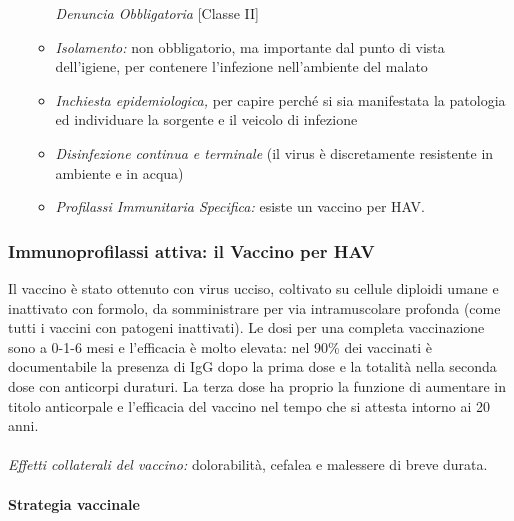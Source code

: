 \begin{enumerate}
\begin{itemize}
  \emph{Denuncia Obbligatoria} {[}Classe II{]}
   
\item
   
  \emph{Isolamento:} non obbligatorio, ma importante dal punto di vista
  dell'igiene, per contenere l'infezione nell'ambiente del malato
   
\item
   
  \emph{Inchiesta epidemiologica,} per capire perché si sia manifestata
  la patologia ed individuare la sorgente e il veicolo di infezione
   
\item
   
  \emph{Disinfezione continua e terminale} (il virus è discretamente
  resistente in ambiente e in acqua)
   
\item
   
  \emph{Profilassi Immunitaria Specifica:} esiste un vaccino per HAV.
   
\end{itemize}
\end{enumerate}
\subsubsection{Immunoprofilassi attiva: il Vaccino per HAV}


Il vaccino è stato ottenuto con virus ucciso, coltivato su cellule
diploidi umane e inattivato con formolo, da somministrare per via
intramuscolare profonda (come tutti i vaccini con patogeni inattivati).
Le dosi per una completa vaccinazione sono a 0-1-6 mesi e l'efficacia è
molto elevata: nel 90\% dei vaccinati è documentabile la presenza di IgG
dopo la prima dose e la totalità nella seconda dose con anticorpi
duraturi. La terza dose ha proprio la funzione di aumentare in titolo
anticorpale e l'efficacia del vaccino nel tempo che si attesta intorno
ai 20 anni.
\\\\
\emph{Effetti collaterali del vaccino:} dolorabilità, cefalea e
malessere di breve durata.

\paragraph{Strategia vaccinale}


